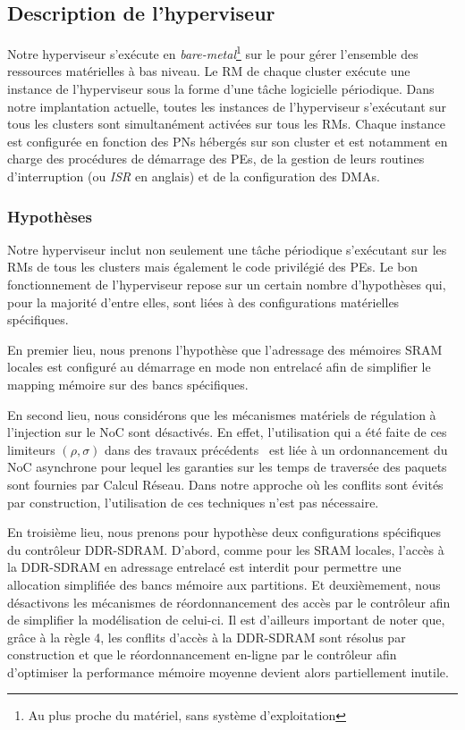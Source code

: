 \documentclass[main.tex]{subfiles}
\begin{document}
\subsection{Description de l'hyperviseur}
Notre hyperviseur s'exécute en \emph{bare-metal}\footnote{Au plus proche du matériel, sans système d'exploitation} sur le \mppalong pour gérer l'ensemble des ressources matérielles à bas niveau. Le RM de chaque cluster exécute une instance de l'hyperviseur sous la forme d'une tâche logicielle périodique. Dans notre implantation actuelle, toutes les instances de l'hyperviseur s'exécutant sur tous les clusters sont simultanément activées sur tous les RMs. Chaque instance est configurée en fonction des PNs hébergés sur son cluster et est notamment en charge des procédures de démarrage des PEs, de la gestion de leurs routines d'interruption (ou \emph{ISR} en anglais) et de la configuration des DMAs.

\subsubsection{Hypothèses}
\label{sssec_resumeFr_hypoHV}
Notre hyperviseur inclut non seulement une tâche périodique s'exécutant sur les RMs de tous les clusters mais également le code privilégié des PEs. Le bon fonctionnement de l'hyperviseur repose sur un certain nombre d'hypothèses qui, pour la majorité d'entre elles, sont liées à des configurations matérielles spécifiques. 

En premier lieu, nous prenons l'hypothèse que l'adressage des mémoires SRAM locales est configuré au démarrage en mode non entrelacé afin de simplifier le mapping mémoire sur des bancs spécifiques. 

En second lieu, nous considérons que les mécanismes matériels de régulation à l'injection sur le NoC sont désactivés. En effet, l'utilisation qui a été faite de ces limiteurs $(\rho , \sigma)$ dans des travaux précédents~\cite{Dinechin2014,Giannopoulou2015} est liée à un ordonnancement du NoC asynchrone pour lequel les garanties sur les temps de traversée des paquets sont fournies par Calcul Réseau. Dans notre approche où les conflits sont évités par construction, l'utilisation de ces techniques n'est pas nécessaire.

En troisième lieu, nous prenons pour hypothèse deux configurations spécifiques du contrôleur DDR-SDRAM. D'abord, comme pour les SRAM locales, l'accès à la DDR-SDRAM en adressage entrelacé est interdit pour permettre une allocation simplifiée des bancs mémoire aux partitions. Et deuxièmement, nous désactivons les mécanismes de réordonnancement des accès par le contrôleur afin de simplifier la modélisation de celui-ci. Il est d'ailleurs important de noter que, grâce à la règle 4, les conflits d'accès à la DDR-SDRAM sont résolus par construction et que le réordonnancement en-ligne par le contrôleur afin d'optimiser la performance mémoire moyenne devient alors partiellement inutile.
\end{document}
